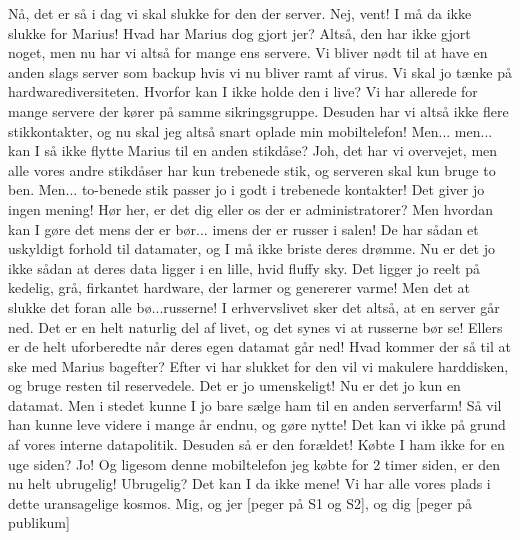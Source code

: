 \documentclass[a4paper,11pt]{article}
\begin{document}
\begin{sketch}
 Nå, det er så i dag vi skal slukke for den der server.
 Nej, vent! I må da ikke slukke for Marius!
 Hvad har Marius dog gjort jer?
 Altså, den har ikke gjort noget, men nu har vi altså for mange ens
    servere. Vi bliver nødt til at have en anden slags server som backup
    hvis vi nu bliver ramt af virus.
 Vi skal jo tænke på hardwarediversiteten.
 Hvorfor kan I ikke holde den i live?
 Vi har allerede for mange servere der kører på samme sikringsgruppe.
 Desuden har vi altså ikke flere stikkontakter, og nu skal jeg altså snart
    oplade min mobiltelefon!
 Men... men... kan I så ikke flytte Marius til en anden stikdåse?
 Joh, det har vi overvejet, men alle vores andre stikdåser har kun
    trebenede stik, og serveren skal kun bruge to ben.
 Men... to-benede stik passer jo i godt i trebenede kontakter!
   Det giver jo ingen mening!
 Hør her, er det dig eller os der er administratorer?
 Men hvordan kan I gøre det mens der er bør... imens der er russer i salen!
   De har sådan et uskyldigt forhold til datamater, og I må ikke briste
   deres drømme.
 Nu er det jo ikke sådan at deres data ligger i en lille, hvid fluffy
    sky. Det ligger jo reelt på kedelig, grå, firkantet hardware, der
    larmer og genererer varme!
 Men det at slukke det foran alle bø...russerne!
 I erhvervslivet sker det altså, at en server går ned. Det er en
    helt naturlig del af livet, og det synes vi at russerne bør se!
    Ellers er de helt uforberedte når deres egen datamat går ned!
 Hvad kommer der så til at ske med Marius bagefter?
 Efter vi har slukket for den vil vi makulere harddisken, og
    bruge resten til reservedele.
 Det er jo umenskeligt!
 Nu er det jo kun en datamat.
 Men i stedet kunne I jo bare sælge ham til en anden serverfarm!
   Så vil han kunne leve videre i mange år endnu, og gøre nytte!
 Det kan vi ikke på grund af vores interne datapolitik.
 Desuden så er den forældet!
 Købte I ham ikke for en uge siden?
 Jo! Og ligesom denne mobiltelefon jeg købte for 2 timer siden,
    er den nu helt ubrugelig!
 Ubrugelig? Det kan I da ikke mene! Vi har alle vores plads i dette
   uransagelige kosmos. Mig, og jer [peger på S1 og S2], og dig [peger på publikum]

\end{sketch}
\end{document}
